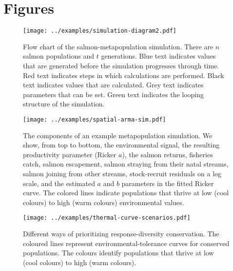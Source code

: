 \clearpage

\section{Figures}

\clearpage

\begin{figure}[htbp]
\centering
\texttt{[image: ../examples/simulation-diagram2.pdf]}
\caption{Flow chart of the salmon-metapopulation simulation. There are $n$ 
salmon populations and $t$ generations. Blue text indicates values that are 
generated before the simulation progresses through time. Red text indicates 
steps in which calculations are performed. Black text indicates values that are 
calculated. Grey text indicates parameters that can be set. Green text 
indicates the looping structure of the simulation.}
\label{f:sim-flow}
\end{figure}

\clearpage

\begin{figure}[htbp]
\centering
\texttt{[image: ../examples/spatial-arma-sim.pdf]}
\caption{The components of an example metapopulation simulation.  We show, from 
top to bottom, the environmental signal, the resulting productivity parameter 
(Ricker $a$), the salmon returns, fisheries catch, salmon escapement, salmon 
straying from their natal streams, salmon joining from other streams, 
stock-recruit residuals on a log scale, and the estimated $a$ and $b$ 
parameters in the fitted Ricker curve. The colored lines indicate populations 
that thrive at low (cool colours) to high (warm colours) environmental values.}
\label{f:sp-eg}
\end{figure}

\clearpage

\begin{figure}[htbp]
\centering
\texttt{[image: ../examples/thermal-curve-scenarios.pdf]}
\caption{Different ways of prioritizing response-diversity conservation. The 
coloured lines represent environmental-tolerance curves for conserved 
populations. The colours identify populations that thrive at low (cool colours) 
to high (warm colours).}
\label{f:curves}
\end{figure}

\clearpage

